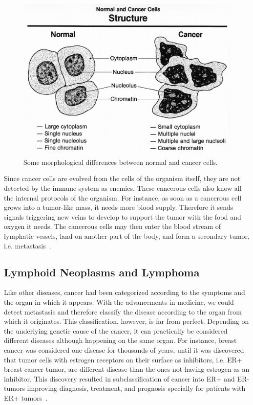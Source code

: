 \begin{figure}[!ht]
  \centering
  \includegraphics[width=.8\textwidth]{figs/background/Normal_and_cancer_cells_structure}
  \caption{Some morphological differences between normal and cancer cells.}
  \label{fig:bkg:normal-cancer}
\end{figure}

Since cancer cells are evolved from the cells of the organism itself, they are not detected by the immune system as enemies. These cancerous cells also know all the internal protocols of the organism. For instance, as soon as a cancerous cell grows into a tumor-like mass, it needs more blood supply. Therefore it sends signals triggering new veins to develop to support the tumor with the food and oxygen it needs. The cancerous cells may then enter the blood stream of lymphatic vessels, land on another part of the body, and form a secondary tumor, i.e. metastasis~\cite[Ch. 20]{the-cell}.

\subsection{Lymphoid Neoplasms and Lymphoma}
Like other diseases, cancer had been categorized according to the symptoms and the organ in which it appears. With the advancements in medicine, we could detect metastasis and therefore classify the disease according to the organ from which it originates. This classification, however, is far from perfect. Depending on the underlying genetic cause of the cancer, it can practically be considered different diseases although happening on the same organ. For instance, breast cancer was considered one disease for thousands of years, until it was discovered that tumor cells with estrogen receptors on their surface as inhibitors, i.e. ER+ breast cancer tumor, are different disease than the ones not having estrogen as an inhibitor. This discovery resulted in subclassification of cancer into ER+ and ER- tumors improving diagnosis, treatment, and prognosis specially for patients with ER+ tumors~\cite{the-emperor-of-all-maladies}.

